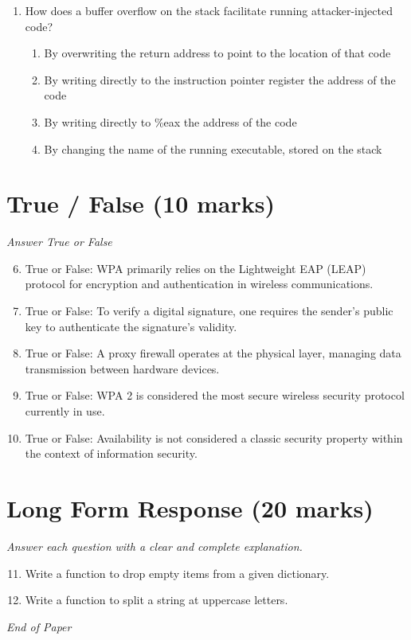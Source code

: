 \documentclass[12pt]{article}
\begin{document}
\begin{enumerate}[label=\arabic*.]
\begin{enumerate}[label=(\alph*)]
    \item xyz
    \item xy
    \item xxzy
    \item xxxxy
\end{enumerate}
\item How does a buffer overflow on the stack facilitate running attacker-injected code?
\begin{enumerate}[label=(\alph*)]
    \item By overwriting the return address to point to the location of that code
    \item By writing directly to the instruction pointer register the address of the code
    \item By writing directly to \%eax the address of the code
    \item By changing the name of the running executable, stored on the stack
\end{enumerate}
\end{enumerate}

\section*{True / False (10 marks)}
\textit{Answer True or False}
\begin{enumerate}[label=\arabic*.]
\setcounter{enumi}{5}
\item True or False: WPA primarily relies on the Lightweight EAP (LEAP) protocol for encryption and authentication in wireless communications.
\item True or False: To verify a digital signature, one requires the sender's public key to authenticate the signature's validity.
\item True or False: A proxy firewall operates at the physical layer, managing data transmission between hardware devices.
\item True or False: WPA 2 is considered the most secure wireless security protocol currently in use.
\item True or False: Availability is not considered a classic security property within the context of information security.
\end{enumerate}

\section*{Long Form Response (20 marks)}
\textit{Answer each question with a clear and complete explanation.}
\begin{enumerate}[label=\arabic*.]
\setcounter{enumi}{10}
\item Write a function to drop empty items from a given dictionary.
\item Write a function to split a string at uppercase letters.
\end{enumerate}

\vfill
\noindent\textit{End of Paper}
\end{document}
